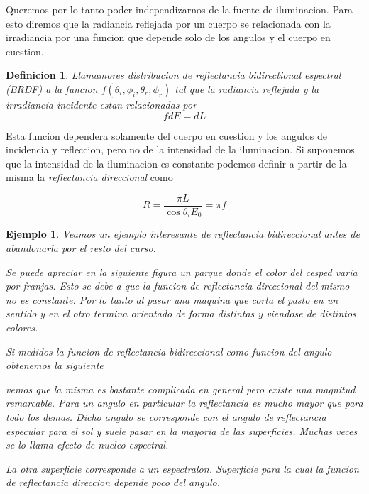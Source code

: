 \documentclass[a4paper,12pt]{article}
\newtheorem{dex}{Definicion}[section]
\newtheorem{exa}{Ejemplo}[section]
\begin{document}
Queremos por lo tanto poder independizarnos de la fuente de iluminacion. Para
esto diremos que la radiancia reflejada por un cuerpo se relacionada con la
irradiancia por una funcion que depende solo de los angulos y el cuerpo en
cuestion.

\begin{dex}
  Llamamores distribucion de reflectancia bidirectional espectral (BRDF) a la
  funcion $f(\theta_i, \phi_i, \theta_r, \phi_r)$ tal que la radiancia reflejada
  y la irradiancia incidente estan relacionadas por
  \begin{equation}
    f dE = dL
  \end{equation}
\end{dex}

Esta funcion dependera solamente del cuerpo en cuestion y los angulos de
incidencia y refleccion, pero no de la intensidad de la iluminacion. Si
suponemos que la intensidad de la iluminacion es constante podemos definir a
partir de la misma la \emph{reflectancia direccional} como 

\begin{equation}
  R = \frac{\pi L}{\cos\theta_i E_0} = \pi f
\end{equation}

\begin{exa}
  Veamos un ejemplo interesante de reflectancia bidireccional antes de abandonarla
  por el resto del curso.

  Se puede apreciar en la siguiente figura un parque donde el color del cesped
  varia por franjas. Esto se debe a que la funcion de reflectancia direccional
  del mismo no es constante. Por lo tanto al pasar una maquina que corta el
  pasto en un sentido y en el otro termina orientado de forma distintas y
  viendose de distintos colores.

  Si medidos la funcion de reflectancia bidireccional como funcion del angulo
  obtenemos la siguiente

  vemos que la misma es bastante complicada en general pero existe una magnitud
  remarcable. Para un angulo en particular la reflectancia es mucho mayor que
  para todo los demas. Dicho angulo se corresponde con el angulo de reflectancia
  especular para el sol y suele pasar en la mayoria de las superficies. Muchas
  veces se lo llama efecto de nucleo espectral.

  La otra superficie corresponde a un espectralon. Superficie para la cual la
  funcion de reflectancia direccion depende poco del angulo.
\end{exa}
\end{document}
